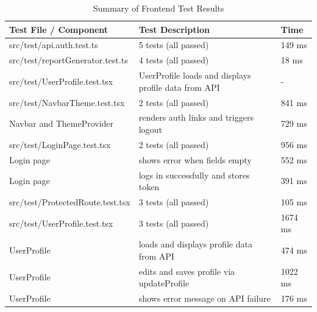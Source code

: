 \begin{table}[h!]
    \centering
    \caption{Summary of Frontend Test Results}

    \begin{tabularx}{\textwidth}{lXl}
        \toprule
        \textbf{Test File / Component}   & \textbf{Test Description}                                   & \textbf{Time} \\
        \midrule
        src/test/api.auth.test.ts        & 5 tests (all passed)                                        & 149 ms        \\
        src/test/reportGenerator.test.ts & 4 tests (all passed)                                        & 18 ms         \\
        src/test/UserProfile.test.tsx    & UserProfile loads and displays profile data from API        & -             \\
        \midrule
        src/test/NavbarTheme.test.tsx    & 2 tests (all passed)                                        & 841 ms        \\
        Navbar and ThemeProvider         & renders auth links and triggers logout                      & 729 ms        \\
        \midrule
        src/test/LoginPage.test.tsx      & 2 tests (all passed)                                        & 956 ms        \\
        Login page                       & shows error when fields empty                               & 552 ms        \\
        Login page                       & logs in successfully and stores token                       & 391 ms        \\
        \midrule
        src/test/ProtectedRoute.test.tsx & 3 tests (all passed)                                        & 105 ms        \\
        \midrule
        src/test/UserProfile.test.tsx    & 3 tests (all passed)                                        & 1674 ms       \\
        UserProfile                      & loads and displays profile data from API                    & 474 ms        \\
        UserProfile                      & edits and saves profile via updateProfile                   & 1022 ms       \\
        UserProfile                      & shows error message on API failure                          & 176 ms        \\

\end{tabularx}
\end{table}
